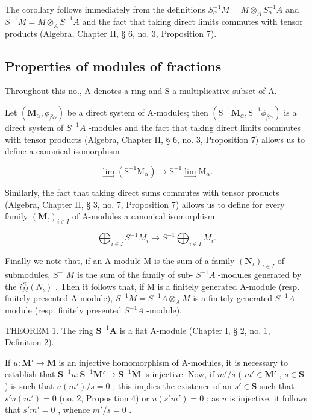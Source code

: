 The corollary follows immediately from the definitions \(S_{\alpha}^{-1}M = M \otimes_{A} S_{\alpha}^{-1}A\) and \(S^{-1}M = M \otimes_{A} S^{-1}A\) and the fact that taking direct limits commutes with tensor products (Algebra, Chapter II, § 6, no. 3, Proposition 7).

\subsection{Properties of modules of fractions}

Throughout this no., A denotes a ring and S a multiplicative subset of A.

Let \((\mathbf{M}_{\alpha}, \phi_{\beta\alpha})\) be a direct system of A-modules; then \((\mathrm{S}^{-1}\mathbf{M}_{\alpha}, \mathrm{S}^{-1}\phi_{\beta\alpha})\) is a direct system of \(S^{-1}A\) -modules and the fact that taking direct limits commutes with tensor products (Algebra, Chapter II, § 6, no. 3, Proposition 7) allows us to define a canonical isomorphism

\[
\lim _ {\longrightarrow} \left(\mathrm{S} ^ {- 1} \mathrm{M} _ {\alpha}\right)\rightarrow \mathrm{S} ^ {- 1} \lim _ {\longrightarrow} \mathrm{M} _ {\alpha}.
\]

Similarly, the fact that taking direct sums commutes with tensor products (Algebra, Chapter II, § 3, no. 7, Proposition 7) allows us to define for every family \((\mathbf{M}_t)_{i\in I}\) of A-modules a canonical isomorphism

\[
\bigoplus_ {i \in I} S ^ {- 1} M _ {i} \rightarrow S ^ {- 1} \bigoplus_ {i \in I} M _ {i}.
\]

Finally we note that, if an A-module M is the sum of a family \((\mathbf{N}_{\iota})_{\iota\in I}\) of submodules, \(S^{-1}M\) is the sum of the family of sub- \(S^{-1}A\) -modules generated by the \(i_{M}^{S}(N_{\iota})\) . Then it follows that, if M is a finitely generated A-module (resp. finitely presented A-module), \(S^{-1}M = S^{-1}A \otimes_{A} M\) is a finitely generated \(S^{-1}A\) -module (resp. finitely presented \(S^{-1}A\) -module).

THEOREM 1. The ring \(\mathbf{S}^{-1}\mathbf{A}\) is a flat A-module (Chapter I, § 2, no. 1, Definition 2).

If \(u: \mathbf{M}' \to \mathbf{M}\) is an injective homomorphism of A-modules, it is necessary to establish that \(\mathbf{S}^{-1}u: \mathbf{S}^{-1}\mathbf{M}' \to \mathbf{S}^{-1}\mathbf{M}\) is injective. Now, if \(m'/s\) ( \(m' \in \mathbf{M}'\) , \(s \in \mathbf{S}\) ) is such that \(u(m')/s = 0\) , this implies the existence of an \(s' \in \mathbf{S}\) such that \(s'u(m') = 0\) (no. 2, Proposition 4) or \(u(s'm') = 0\) ; as \(u\) is injective, it follows that \(s'm' = 0\) , whence \(m'/s = 0\) .


